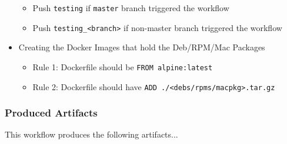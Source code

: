 \documentclass[a4paper,11pt]{article}
\begin{document}
\begin{itemize}
\begin{itemize}
        \item Push \verb|testing| if \verb|master| branch triggered the workflow
        \item Push \verb|testing_<branch>| if non-master branch triggered the workflow
    \end{itemize}
    \item Creating the Docker Images that hold the Deb/RPM/Mac Packages
    \begin{itemize}
        \item Rule 1: Dockerfile should be \verb|FROM alpine:latest|
        \item Rule 2: Dockerfile should have \verb|ADD ./<debs/rpms/macpkg>.tar.gz|
    \end{itemize}
\end{itemize}

\subsubsection{Produced Artifacts}
This workflow produces the following artifacts...
\end{document}
